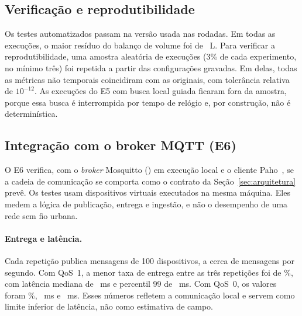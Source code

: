 \subsection{Verificação e reprodutibilidade}\label{sec:verificacao}

Os \NTestes{} testes automatizados passam na versão usada nas rodadas. Em
todas as execuções, o maior resíduo do balanço de volume foi de
\BalancoMaxResidual{}~L. Para verificar a reprodutibilidade, uma amostra
aleatória de \ReproN{} execuções (3\% de cada experimento, no mínimo três) foi
repetida a partir das configurações gravadas. Em \ReproIdenticas{} delas,
todas as métricas não temporais coincidiram com as originais, com tolerância
relativa de $10^{-12}$. As execuções do E5 com busca local guiada ficaram fora
da amostra, porque essa busca é interrompida por tempo de relógio e, por
construção, não é determinística.

\subsection{Integração com o broker MQTT (E6)}\label{sec:e6}

O E6 verifica, com o \emph{broker} Mosquitto (\BrokerVersion) em execução
local e o cliente Paho~\PahoVersion, se a cadeia de comunicação se comporta
como o contrato da Seção~\ref{sec:arquitetura} prevê. Os testes usam
dispositivos virtuais executados na mesma máquina. Eles medem a lógica de
publicação, entrega e ingestão, e não o desempenho de uma rede sem fio
urbana.

\paragraph{Entrega e latência.}
Cada repetição publica \MqttPubUm{} mensagens de 100 dispositivos, a cerca de
\MqttRateUm{} mensagens por segundo. Com QoS~1, a menor taxa de entrega entre
as três repetições foi de \MqttDelivUm\%, com latência mediana de
\MqttLatMedUm{}~ms e percentil 99 de \MqttLatPNNUm{}~ms. Com QoS~0, os valores
foram \MqttDelivZero\%, \MqttLatMedZero{}~ms e \MqttLatPNNZero{}~ms. Esses
números refletem a comunicação local e servem como limite inferior de
latência, não como estimativa de campo.

